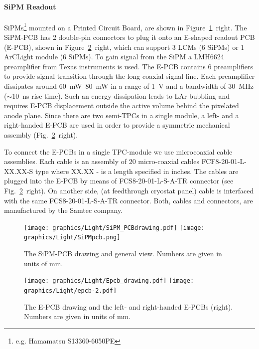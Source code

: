 \paragraph{SiPM Readout}

SiPMs\footnote{e.g. Hamamatsu S13360-6050PE} mounted on a Printed Circuit Board, are shown in Figure~\ref{fig:pcb}~right. The SiPM-PCB has \num{2} double-pin connectors to plug it onto an E-shaped readout PCB (E-PCB), shown in Figure~\ref{fig:e-pcb}~right, which can support 3 LCMs (6 SiPMs) or 1 ArCLight module (6 SiPMs). To gain signal from the SiPM a LMH6624 preamplifier from Texas instruments is used. The E-PCB contains 6 preamplifiers to provide signal transition through the long coaxial signal line. Each preamplifier dissipates around \SIrange{60}{80}{\milli\watt} in a range of \SI{1}{\volt} and a bandwidth of \SI{30}{\mega\hertz} ($\sim$\SI{10}{\nano\second} rise time). Such an energy dissipation leads to LAr bubbling and requires E-PCB displacement outside the active volume behind the pixelated anode plane. Since there are two semi-TPCs in a single module, a left- and a right-handed E-PCB are used in order to provide a symmetric mechanical assembly (Fig.~\ref{fig:e-pcb}~right). 

To connect the E-PCBs in a single TPC-module we use microcoaxial cable assemblies. Each cable is an assembly of \num{20} micro-coaxial cables FCF8-20-01-L-XX.XX-S type where XX.XX - is a length specified in inches. The cables are plugged into the E-PCB by means of FCS8-20-01-L-S-A-TR connector (see Fig.~\ref{fig:e-pcb}~right). On another side, (at feedthrough cryostat panel) cable is interfaced with the same FCS8-20-01-L-S-A-TR connector. Both, cables and connectors, are manufactured by the Samtec company. 



\begin{figure}[htbp]
\centering 
\texttt{[image: graphics/Light/SiPM\_PCBdrawing.pdf]}
\qquad
\texttt{[image: graphics/Light/SiPMpcb.png]}
\caption{\label{fig:pcb} The SiPM-PCB drawing and general view. Numbers are given in units of mm.}
\end{figure}

\begin{figure}[htbp]
\centering 
\texttt{[image: graphics/Light/Epcb\_drawing.pdf]}
\qquad
\texttt{[image: graphics/Light/epcb-2.pdf]}
\caption{\label{fig:e-pcb} The E-PCB drawing and the left- and right-handed E-PCBs (right). Numbers are given in units of mm.}
\end{figure}


